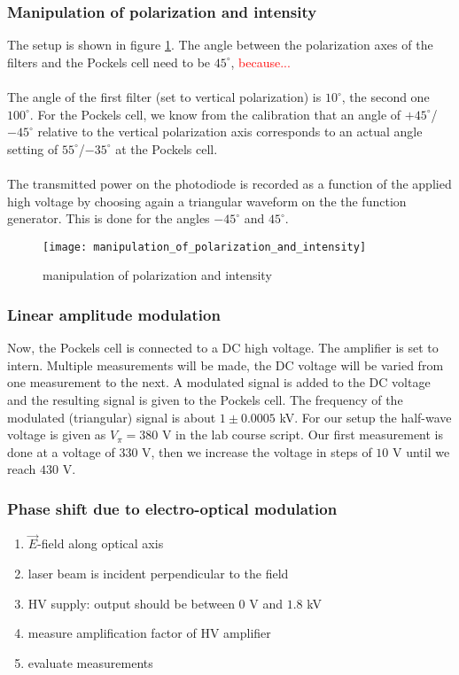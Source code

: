 \newpage
\subsubsection{Manipulation of polarization and intensity}
The setup is shown in figure
\ref{manipulation_of_polarization_and_intensity}. The angle between
the polarization axes of the filters and the Pockels cell need to be
$45^\circ$, \textcolor{red}{because...} \\ \\
The angle of the first filter (set to vertical polarization) is
$10^\circ$, the second one $100^\circ$. For the Pockels cell, we know from
the calibration that an angle of $+45^\circ$/$-45^\circ$ relative to the 
vertical polarization axis corresponds to an actual angle setting of
$55^\circ$/$-35^\circ$ at the Pockels cell. \\ \\
The transmitted power on the photodiode is recorded as a function of
the applied high voltage by choosing again a triangular waveform on the
the function generator. This is done for the angles $-45^\circ$ and
$45^\circ$.
\begin{figure}[h!]
    \center
    \texttt{[image: manipulation\_of\_polarization\_and\_intensity]}
    \caption{manipulation of polarization and intensity}
    \label{manipulation_of_polarization_and_intensity}
\end{figure}

\subsubsection{Linear amplitude modulation}
Now, the Pockels cell is connected to a DC high voltage.
The amplifier is set to intern. Multiple
measurements will be made, the DC voltage will be varied from one
measurement to the next. A modulated signal is added to the DC voltage
and the resulting signal is given to the Pockels cell.
The frequency of the modulated (triangular) signal is about $1\pm0.0005$ kV.
For our setup the half-wave voltage is given as $V_\pi=380$ V
in the lab course script\cite{F85}. Our first measurement is done at a
voltage of $330$ V, then we increase the voltage in steps of $10$ V
until we reach $430$ V.

\newpage
\subsubsection{Phase shift due to electro-optical modulation}
\begin{enumerate}
    \item $\vec E$-field along optical axis
    \item laser beam is incident perpendicular to the field
    \item HV supply: output should be between $0$ V and $1.8$ kV
    \item measure amplification factor of HV amplifier
    \item evaluate measurements
\end{enumerate}

